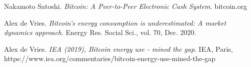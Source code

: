 \documentclass[a4paper]{article}
\begin{document}
\appendix

\begin{thebibliography}{9}

 Nakamoto Satoshi. \emph{Bitcoin: A Peer-to-Peer Electronic Cash System}. bitcoin.org

 Alex de Vries. \emph{Bitcoin’s energy consumption is underestimated: A market dynamics approach}. Energy Res. Social Sci., vol. 70, Dec. 2020.

 Alex de Vries. \emph{IEA (2019), Bitcoin energy use - mined the gap}.  IEA, Paris, https://www.iea.org/commentaries/bitcoin-energy-use-mined-the-gap 



\end{thebibliography}
\end{document}
